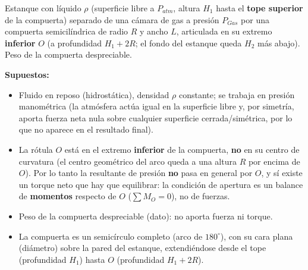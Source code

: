 \documentclass[11pt]{article}
\newenvironment{supuestos}{%
  \noindent\textbf{Supuestos:}
  \begin{itemize}[leftmargin=1.4em, itemsep=1pt]
}{%
  \end{itemize}
}
\begin{document}
\vspace{4pt}

\newpage
{}

\noindent Estanque con l\'iquido $\rho$ (superficie libre a $P_{atm}$, altura $H_1$
hasta el \textbf{tope superior} de la compuerta) separado de una c\'amara de gas a
presi\'on $P_{Gas}$ por una compuerta semicil\'indrica de radio $R$ y ancho $L$,
articulada en su extremo \textbf{inferior} $O$ (a profundidad $H_1+2R$; el fondo del
estanque queda $H_2$ m\'as abajo). Peso de la compuerta despreciable.

\begin{supuestos}
\item Fluido en reposo (hidrost\'atica), densidad $\rho$ constante; se trabaja en
presi\'on manom\'etrica (la atm\'osfera act\'ua igual en la superficie libre y, por
simetr\'ia, aporta fuerza neta nula sobre cualquier superficie cerrada/sim\'etrica, por
lo que no aparece en el resultado final).
\item La r\'otula $O$ est\'a en el extremo \textbf{inferior} de la compuerta, \textbf{no}
en su centro de curvatura (el centro geom\'etrico del arco queda a una altura $R$ por
encima de $O$). Por lo tanto la resultante de presi\'on \textbf{no} pasa en general por
$O$, y s\'i existe un torque neto que hay que equilibrar: la condici\'on de apertura es
un balance de \textbf{momentos} respecto de $O$ ($\sum M_O=0$), no de fuerzas.
\item Peso de la compuerta despreciable (dato): no aporta fuerza ni torque.
\item La compuerta es un semic\'irculo completo (arco de $180^\circ$), con su cara plana
(di\'ametro) sobre la pared del estanque, extendi\'endose desde el tope (profundidad
$H_1$) hasta $O$ (profundidad $H_1+2R$).
\end{supuestos}
\end{document}
